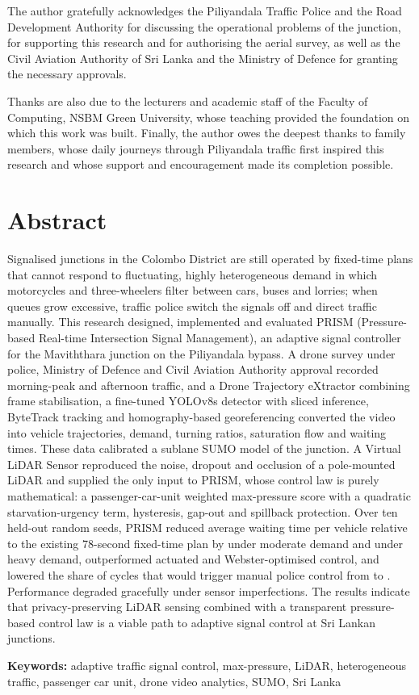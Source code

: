 The author gratefully acknowledges the Piliyandala Traffic Police and the Road Development Authority for discussing the operational problems of the junction, for supporting this research and for authorising the aerial survey, as well as the Civil Aviation Authority of Sri Lanka and the Ministry of Defence for granting the necessary approvals.

Thanks are also due to the lecturers and academic staff of the Faculty of Computing, NSBM Green University, whose teaching provided the foundation on which this work was built. Finally, the author owes the deepest thanks to family members, whose daily journeys through Piliyandala traffic first inspired this research and whose support and encouragement made its completion possible.

\chapter*{Abstract}

Signalised junctions in the Colombo District are still operated by fixed-time plans that cannot respond to fluctuating, highly heterogeneous demand in which motorcycles and three-wheelers filter between cars, buses and lorries; when queues grow excessive, traffic police switch the signals off and direct traffic manually. This research designed, implemented and evaluated PRISM (Pressure-based Real-time Intersection Signal Management), an adaptive signal controller for the Maviththara junction on the Piliyandala bypass. A drone survey under police, Ministry of Defence and Civil Aviation Authority approval recorded morning-peak and afternoon traffic, and a Drone Trajectory eXtractor combining frame stabilisation, a fine-tuned YOLOv8s detector with sliced inference, ByteTrack tracking and homography-based georeferencing converted the video into vehicle trajectories, demand, turning ratios, saturation flow and waiting times. These data calibrated a sublane SUMO model of the junction. A Virtual LiDAR Sensor reproduced the noise, dropout and occlusion of a pole-mounted LiDAR and supplied the only input to PRISM, whose control law is purely mathematical: a passenger-car-unit weighted max-pressure score with a quadratic starvation-urgency term, hysteresis, gap-out and spillback protection. Over ten held-out random seeds, PRISM reduced average waiting time per vehicle relative to the existing 78-second fixed-time plan by  under moderate demand and  under heavy demand, outperformed actuated and Webster-optimised control, and lowered the share of cycles that would trigger manual police control from  to . Performance degraded gracefully under sensor imperfections. The results indicate that privacy-preserving LiDAR sensing combined with a transparent pressure-based control law is a viable path to adaptive signal control at Sri Lankan junctions.

\vspace{0.4cm}
\noindent\textbf{Keywords:} adaptive traffic signal control, max-pressure, LiDAR, heterogeneous traffic, passenger car unit, drone video analytics, SUMO, Sri Lanka
